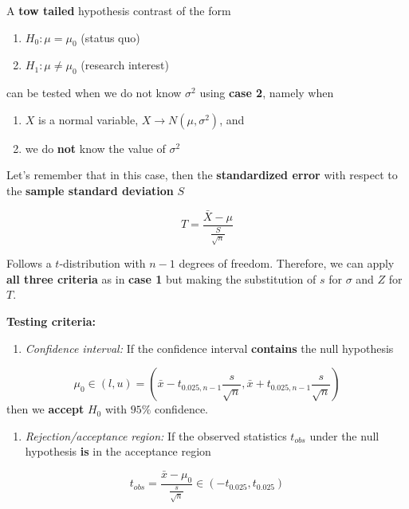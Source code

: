 \documentclass[
]{book}
\providecommand{\tightlist}{%
  \setlength{\itemsep}{0pt}\setlength{\parskip}{0pt}}
\begin{document}
A \textbf{tow tailed} hypothesis contrast of the form

\begin{enumerate}
\def\labelenumi{\alph{enumi}.}
\tightlist
\item
  \(H_0:\mu = \mu_0\) (status quo)
\item
  \(H_1:\mu \neq \mu_0\) (research interest)
\end{enumerate}

can be tested when we do not know \(\sigma^2\) using \textbf{case 2}, namely when

\begin{enumerate}
\def\labelenumi{\arabic{enumi}.}
\tightlist
\item
  \(X\) is a normal variable, \(X \rightarrow N(\mu, \sigma^2)\), and
\item
  we do \textbf{not} know the value of \(\sigma^2\)
\end{enumerate}

Let's remember that in this case, then the \textbf{standardized error} with respect to the \textbf{sample standard deviation} \(S\)

\[T=\frac{\bar{X}-\mu}{\frac{S}{\sqrt{n}}}\]

Follows a \(t\)-distribution with \(n-1\) degrees of freedom. Therefore, we can apply \textbf{all three criteria} as in \textbf{case 1} but making the substitution of \(s\) for \(\sigma\) and \(Z\) for \(T\).

\textbf{Testing criteria:}

\begin{enumerate}
\def\labelenumi{\arabic{enumi}.}
\tightlist
\item
  \emph{Confidence interval:} If the confidence interval \textbf{contains} the null hypothesis
\end{enumerate}

\[\mu_0\in (l,u)=(\bar{x}-t_{0.025,n-1} \frac{s}{\sqrt{n}}, \bar{x}+t_{0.025,n-1} \frac{s}{\sqrt{n}})\] then we \textbf{accept} \(H_0\) with \(95\%\) confidence.

\begin{enumerate}
\def\labelenumi{\arabic{enumi}.}
\setcounter{enumi}{1}
\tightlist
\item
  \emph{Rejection/acceptance region:} If the observed statistics \(t_{obs}\) under the null hypothesis \textbf{is} in the acceptance region
\end{enumerate}

\[t_{obs}=\frac{\bar{x}-\mu_0}{\frac{s}{\sqrt{n}}} \in (-t_{0.025}, t_{0.025})\]
\end{document}
